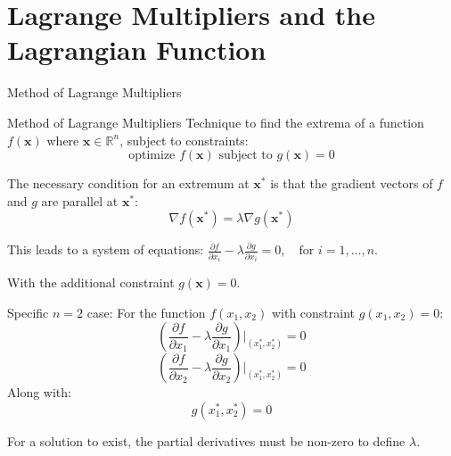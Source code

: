 \documentclass[
    NAME={Dr. Helga Ingimundardóttir},
    EMAIL={helgaingim@hi.is},
    FACULTY={Industrial Engineering},
    TITLE={Nonlinear Optimization},
    SUBTITLE={Approaches and Challenges},
    SEMINAR={VÉL113F},
    DATE={Design and Optimization}
]{../HI-latex/hi-beamer}
\begin{document}
    \section{Lagrange Multipliers and the Lagrangian Function}
    \begin{frame}{Method of Lagrange Multipliers}
        \begin{block}{Method of Lagrange Multipliers}
            Technique to find the extrema of a function \( f(\mathbf{x}) \) where
            \( \mathbf{x} \in \mathbb{R}^n \), subject to constraints:
            \[ \text{optimize } f(\mathbf{x}) \text{ subject to } g(\mathbf{x}) = 0 \]

            The necessary condition for an extremum at \( \mathbf{x^*} \) is that the gradient vectors of \( f \) and \( g \) are parallel at \( \mathbf{x^*} \):
            \[ \nabla f(\mathbf{x^*}) = \lambda \nabla g(\mathbf{x^*}) \]

            This leads to a system of equations:
            $ \frac{\partial f}{\partial x_i} - \lambda \frac{\partial g}{\partial x_i} = 0, \quad \text{for } i = 1
            , \ldots , n $.

            With the additional constraint $ g(\mathbf{x}) = 0 $.
        \end{block}
        \framebreak
        \alert{Specific \( n=2 \) case:}
        For the function \( f(x_1, x_2) \) with constraint \( g(x_1, x_2) = 0 \):
        \[ \left( \frac{\partial f}{\partial x_1} - \lambda \frac{\partial g}{\partial x_1} \right) \Bigg|_{(x_1^*,x_2^*)} = 0 \]
        \[ \left( \frac{\partial f}{\partial x_2} - \lambda \frac{\partial g}{\partial x_2} \right) \Bigg|_{(x_1^*,x_2^*)} = 0 \]
        Along with:
        \[ g(x_1^*, x_2^*) = 0 \]

        For a solution to exist, the partial derivatives must be non-zero to define \( \lambda \).
    \end{frame}
\end{document}
